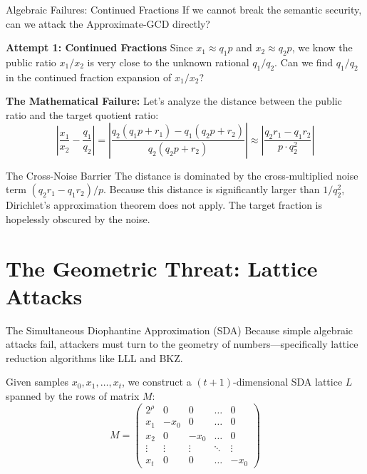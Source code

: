 \documentclass[10pt, aspectratio=169]{beamer}
\begin{document}
\begin{frame}{Algebraic Failures: Continued Fractions}
    If we cannot break the semantic security, can we attack the Approximate-GCD directly?
    
    \vspace{0.2cm}
    \textbf{Attempt 1: Continued Fractions}
    Since $x_1 \approx q_1 p$ and $x_2 \approx q_2 p$, we know the public ratio $x_1 / x_2$ is very close to the unknown rational $q_1 / q_2$. Can we find $q_1/q_2$ in the continued fraction expansion of $x_1/x_2$?
    \pause
    
    \vspace{0.2cm}
    \textbf{The Mathematical Failure:}
    Let's analyze the distance between the public ratio and the target quotient ratio:
    $$ \left| \frac{x_1}{x_2} - \frac{q_1}{q_2} \right| = \left| \frac{q_2(q_1 p + r_1) - q_1(q_2 p + r_2)}{q_2(q_2 p + r_2)} \right| \approx \left| \frac{q_2 r_1 - q_1 r_2}{p \cdot q_2^2} \right| $$
    \pause
    
    \begin{block}{The Cross-Noise Barrier}
    The distance is dominated by the cross-multiplied noise term $(q_2 r_1 - q_1 r_2) / p$. Because this distance is significantly larger than $1/q_2^2$, Dirichlet's approximation theorem does not apply. The target fraction is hopelessly obscured by the noise.
    \end{block}
\end{frame}

\section{The Geometric Threat: Lattice Attacks}

\begin{frame}{The Simultaneous Diophantine Approximation (SDA)}
    Because simple algebraic attacks fail, attackers must turn to the geometry of numbers—specifically lattice reduction algorithms like LLL and BKZ.
    \pause
    
    \vspace{0.2cm}
    Given samples $x_0, x_1, \dots, x_t$, we construct a $(t+1)$-dimensional SDA lattice $L$ spanned by the rows of matrix $M$:
    $$ M = \begin{pmatrix} 
    2^\rho & 0 & 0 & \dots & 0 \\ 
    x_1 & -x_0 & 0 & \dots & 0 \\ 
    x_2 & 0 & -x_0 & \dots & 0 \\ 
    \vdots & \vdots & \vdots & \ddots & \vdots \\ 
    x_t & 0 & 0 & \dots & -x_0 
    \end{pmatrix} $$
\end{frame}
\end{document}
